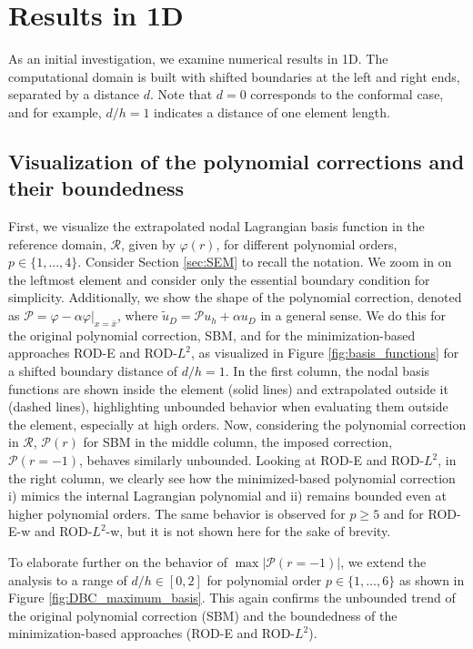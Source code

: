 \documentclass{article}
\renewcommand{\phi}{\varphi}
\begin{document}
\section{Results in 1D}\label{sec:results_1D}

As an initial investigation, we examine numerical results in 1D. The computational domain is built with shifted boundaries at the left and right ends, separated by a distance $d$. Note that $d=0$ corresponds to the conformal case, and for example, $d/h=1$ indicates a distance of one element length.


\subsection{Visualization of the polynomial corrections and their boundedness}

First, we visualize the extrapolated nodal Lagrangian basis function in the reference domain, $\mathcal{R}$, given by $\phi(r)$, for different polynomial orders, $p \in \{1,...,4\}$. Consider Section \ref{sec:SEM} to recall the notation. We zoom in on the leftmost element and consider only the essential boundary condition for simplicity. Additionally, we show the shape of the polynomial correction, denoted as $\mathcal{P} = \phi - \alpha\phi|_{x=\bar{x}}$, where $\tilde{u}_D = \mathcal{P}u_h + \alpha u_D$ in a general sense. We do this for the original polynomial correction, SBM, and for the minimization-based approaches ROD-E and ROD-$L^2$, as visualized in Figure \ref{fig:basis_functions} for a shifted boundary distance of $d/h=1$. In the first column, the nodal basis functions are shown inside the element (solid lines) and extrapolated outside it (dashed lines), highlighting unbounded behavior when evaluating them outside the element, especially at high orders. Now, considering the polynomial correction in $\mathcal{R}$, $\mathcal{P}(r)$ for SBM in the middle column, the imposed correction, $\mathcal{P}(r=-1)$, behaves similarly unbounded. Looking at ROD-E and ROD-$L^2$, in the right column, we clearly see how the minimized-based polynomial correction i) mimics the internal Lagrangian polynomial and ii) remains bounded even at higher polynomial orders. The same behavior is observed for $p\geq 5$ and for ROD-E-w and ROD-$L^2$-w, but it is not shown here for the sake of brevity.

To elaborate further on the behavior of $\max |\mathcal{P}(r=-1)|$, we extend the analysis to a range of $d/h \in [0,2]$ for polynomial order $p \in \{1,\ldots,6\}$ as shown in Figure \ref{fig:DBC_maximum_basis}. This again confirms the unbounded trend of the original polynomial correction (SBM) and the boundedness of the minimization-based approaches (ROD-E and ROD-$L^2$). 
\end{document}
